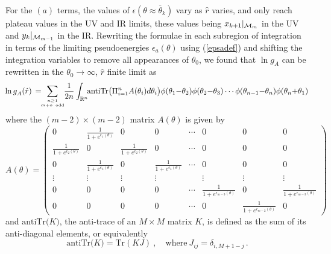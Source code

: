 \documentclass[11pt]{article}
\newcommand{\ep}{\epsilon}
\newcommand\RR{{\mathbb R}}
\newcommand\phup{^{\phantom o}}
\newcommand{\CM}{{\cal M}}
\newcommand\beq{\begin{equation}}
\newcommand\eeq{\end{equation}}
\newcommand{\te}{\theta}
\newcommand{\tz}{\theta_0}
\newcommand{\goA}{g\phup_{A}}
\begin{document}
For the $(a)$ terms, the values of $\epsilon(\te\approx\overline\te_k)$ 
vary as $\hat{r}$
varies, and only reach plateau values in the UV and IR limits, these
values being $x_{k+1}|_{\CM_m}$ in the UV and $y_k|_{\CM_{m-1}}$ in the
IR.
Rewriting the formulae in each subregion of integration in terms of
the limiting pseudoenergies $\ep_a(\theta)$ using (\ref{epsadef}) and
shifting the integration variables to remove
all appearances of $\tz$, we found that
$\ln \goA$ can be rewritten in the $\tz\to\infty$,
$\hat{r}$ finite limit as
\beq
\!\ln \goA(\hat{r})\,= 
\!\!\!\sum_{n\ge 1\atop m+n~{\rm odd}}\!\!
\frac{1}{2n}\int_{\RR^n}\!\!\mbox{antiTr}
\bigl(\Pi_{i=1}^nA(\te_i) d\te_i\bigr)
\phi(\te_1{-}\te_2)\phi(\te_2{-}\te_3)\cdots
\phi(\te_{n-1}{-}\te_n)\phi(\te_n{+}\te_1)
\label{goA}
\eeq
where the $(m-2)\times(m-2)$ matrix $A(\te)$ is given by
\beq
A(\te)=
\left(
\begin{array}{cccccccc}
0&\frac{1}{1+e^{\epsilon_1(\theta)}}&0&0&\cdots&0&0&0\\
\frac{1}{1+e^{\epsilon_2(\theta)}}&0&
\frac{1}{1+e^{\epsilon_2(\theta)}}&0&\cdots&0&0&0\\
0&\frac{1}{1+e^{\epsilon_3(\theta)}}&0&
\frac{1}{1+e^{\epsilon_3(\theta)}}&\cdots&0&0&0\\[7pt]
\vdots&\vdots&\vdots&\vdots&&\vdots&\vdots&\vdots\\[7pt]
0&0&0&0&\cdots&
\frac{1}{1+e^{\epsilon_{m-3}(\theta)}}&0&
\frac{1}{1+e^{\epsilon_{m-3}(\theta)}}\\
0&0&0&0&\cdots&0&\frac{1}{1+e^{\epsilon_{m-2}(\te)}}&0
\end{array}\right)
\label{Ai}
\eeq
and $\mbox{antiTr}\bigl(K\bigr)$,
the anti-trace of an $M\times M$ matrix $K$, is defined as 
the sum of its anti-diagonal elements, or equivalently
\beq
\mbox{antiTr}\bigl(K\bigr)=\mbox{Tr}(KJ)~,
\quad \mbox{where}~ J_{ij}=\delta_{i,M+1-j}\,.
\eeq
\end{document}
